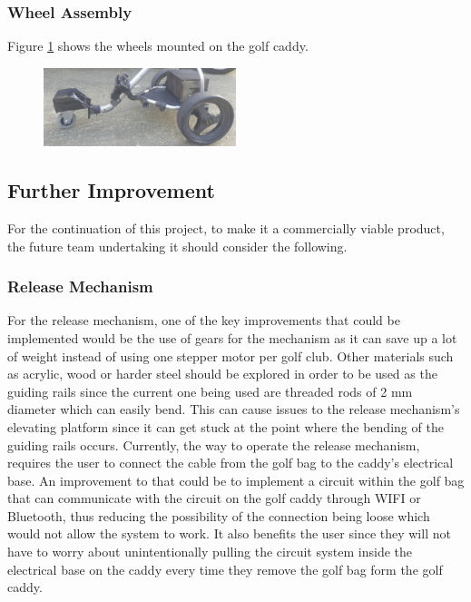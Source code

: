 \documentclass[11pt,landscape]{article}
\begin{document}
\begin{multicols}{2}
    
    \subsubsection{Wheel Assembly}
    Figure \ref{fig:sprayed} shows the wheels mounted on the golf caddy. 
    
    \begin{figure}[H]
        \begin{center}
            \includegraphics[width=0.5\textwidth]{Figure29.jpg}
            \label{fig:sprayed}
        \end{center}
    \end{figure}
    
    
    \subsection{Further Improvement}
    
    For the continuation of this project, to make it a commercially viable
    product, the future team undertaking it should consider the following.
    
    \subsubsection{Release Mechanism}
    For the release mechanism, one of the key improvements that could be
    implemented would be the use of gears for the mechanism as it can save up a
    lot of weight instead of using one stepper motor per golf club. Other
    materials such as acrylic, wood or harder steel should be explored in order
    to be used as the guiding rails since the current one being used are
    threaded rods of 2 mm diameter which can easily bend. This can cause issues
    to the release mechanism’s elevating platform since it can get stuck at the
    point where the bending of the guiding rails occurs. Currently, the way to
    operate the release mechanism, requires the user to connect the cable from
    the golf bag to the caddy’s electrical base. An improvement to that could be
    to implement a circuit within the golf bag that can communicate with the
    circuit on the golf caddy through WIFI or Bluetooth, thus reducing the
    possibility of the connection being loose which would not allow the system
    to work. It also benefits the user since they will not have to worry about
    unintentionally pulling the circuit system inside the electrical base on the
    caddy every time they remove the golf bag form the golf caddy. 
    

\end{multicols}
\end{document}
